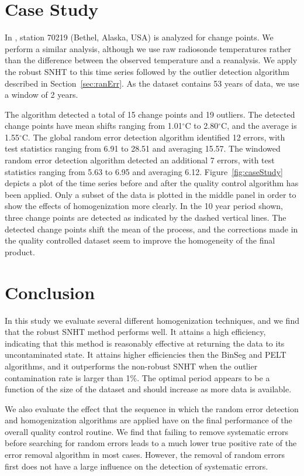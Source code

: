 \documentclass[12pt]{article}
\begin{document}
\begin{doublespacing}
\section{Case Study}

In \cite{haimberger07}, station 70219 (Bethel, Alaska, USA) is analyzed for change points.  We perform a similar analysis, although we use raw radiosonde temperatures rather than the difference between the observed temperature  and a reanalysis.  We apply the robust SNHT to this time series followed by the outlier detection algorithm described in Section~\ref{sec:ranErr}.  As the dataset contains 53 years of data, we use a window of 2 years.

The algorithm detected a total of 15 change points and 19 outliers.  The detected change points have mean shifts ranging from 1.01$^\circ$C to 2.80$^\circ$C, and the average is 1.55$^\circ$C.  The global random error detection algorithm identified 12 errors, with test statistics ranging from 6.91 to 28.51 and averaging 15.57.  The windowed random error detection algorithm detected an additional 7 errors, with test statistics ranging from 5.63 to 6.95 and averaging 6.12. Figure~\ref{fig:caseStudy} depicts a plot of the time series before and after the quality control algorithm has been applied.  Only a subset of the data is plotted in the middle panel in order to show the effects of homogenization more clearly.  In the 10 year period shown, three change points are detected as indicated by the dashed vertical lines.  The detected change points shift the mean of the process, and the corrections made in the quality controlled dataset seem to improve the homogeneity of the final product.

\section{Conclusion}

In this study we evaluate several different homogenization techniques, and we find that the robust SNHT method performs well.  It attains a high efficiency, indicating that this method is reasonably effective at returning the data to its uncontaminated state.  It attains higher efficiencies then the BinSeg and PELT algorithms, and it outperforms the non-robust SNHT when the outlier contamination rate is larger than 1\%.  The optimal period appears to be a function of the size of the dataset and should increase as more data is available.

We also evaluate the effect that the sequence in which the random error detection and homogenization algorithms are applied have on the final performance of the overall quality control routine.  We find that failing to remove systematic errors before searching for random errors leads to a much lower true positive rate of the error removal algorithm in most cases.  However,  the removal of random errors first does not have a large influence on the detection of systematic errors.


\end{doublespacing}
\end{document}
